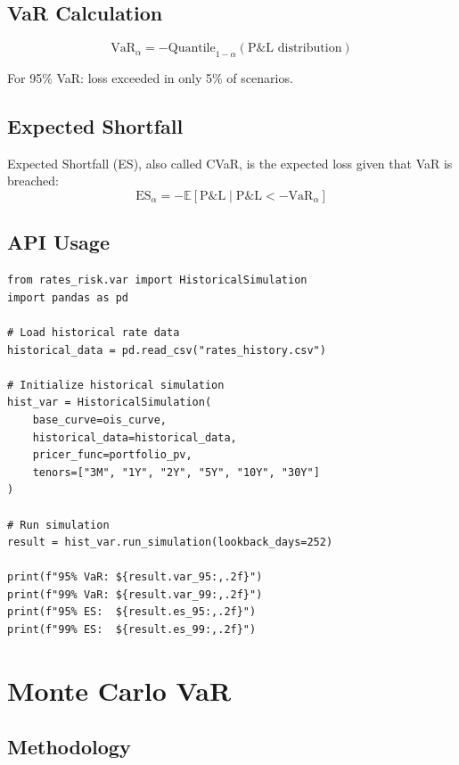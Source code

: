 \documentclass[12pt,a4paper]{report}
\begin{document}
\subsection{VaR Calculation}

\begin{equation}
    \text{VaR}_\alpha = -\text{Quantile}_{1-\alpha}(\text{P\&L distribution})
\end{equation}

For 95\% VaR: loss exceeded in only 5\% of scenarios.

\subsection{Expected Shortfall}

Expected Shortfall (ES), also called CVaR, is the expected loss given that VaR is breached:
\begin{equation}
    \text{ES}_\alpha = -\mathbb{E}[\text{P\&L} \mid \text{P\&L} < -\text{VaR}_\alpha]
\end{equation}

\subsection{API Usage}

\begin{lstlisting}
from rates_risk.var import HistoricalSimulation
import pandas as pd

# Load historical rate data
historical_data = pd.read_csv("rates_history.csv")

# Initialize historical simulation
hist_var = HistoricalSimulation(
    base_curve=ois_curve,
    historical_data=historical_data,
    pricer_func=portfolio_pv,
    tenors=["3M", "1Y", "2Y", "5Y", "10Y", "30Y"]
)

# Run simulation
result = hist_var.run_simulation(lookback_days=252)

print(f"95% VaR: ${result.var_95:,.2f}")
print(f"99% VaR: ${result.var_99:,.2f}")
print(f"95% ES:  ${result.es_95:,.2f}")
print(f"99% ES:  ${result.es_99:,.2f}")
\end{lstlisting}

\section{Monte Carlo VaR}

\subsection{Methodology}
\end{document}
